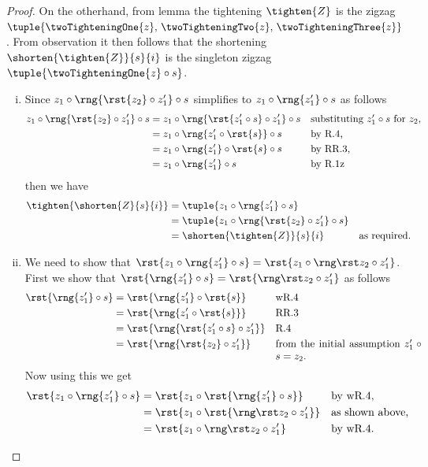 \begin{proof}
On the otherhand, from  lemma 
the tightening $\tighten{Z}$ is the zigzag
$\tuple{ \twoTighteningOne{z},\,\twoTighteningTwo{z},\,\twoTighteningThree{z}}$.
From observation 
it then follows that the shortening $\shorten{\tighten{Z}}{s}{i}$
is the singleton zigzag $\tuple{\twoTighteningOne{z} \circ s}$.
\begin{enumerate}[(i)]
\item %
Since $z_1 \circ \rng{\rst{z_2} \circ z'_1} \circ s$ 
simplifies to $z_1 \circ \rng{z'_1} \circ s$ as follows
\begin{align*}
 z_1 \circ \rng{\rst{z_2} \circ z'_1} \circ s
           &= z_1 \circ \rng{\rst{z'_1 \circ s} \circ z'_1} \circ s
           && \mbox{substituting $z'_1 \circ s$ for $z_2$,} \\
           &= z_1 \circ \rng{z'_1 \circ \rst{s}} \circ s 
           && \mbox{by R.4,} \\
           &= z_1 \circ \rng{z'_1} \circ \rst{s} \circ s
           && \mbox{by RR.3,} \\
           &= z_1 \circ \rng{z'_1} \circ s
           && \mbox{by R.1z} 
\end{align*}
then we have
\begin{align*}
\tighten{\shorten{Z}{s}{i}}
            &= \tuple{ z_1 \circ \rng{z'_1} \circ s } \\
            &= \tuple{
                       z_1 \circ \rng{\rst{z_2} \circ z'_1} \circ s
                     } \\
            &= \shorten{\tighten{Z}}{s}{i} &&\mbox{as required.}
\end{align*}  
\item %
We need to show that 
$\rst{z_1 \circ \rng{z'_1} \circ s}= \rst{z_1 \circ \rngTightenerOne{z}}$.
First we show that 
$\rst{\rng{z'_1} \circ s}=\rst{\rngTightenerOne{z}}$
as follows
\begin{align*}
\rst{\rng{z'_1} \circ s} 
    &= \rst{\rng{z'_1} \circ \rst{s}} && \mbox{wR.4}\\
    &= \rst{ \rng{ z'_1 \circ \rst{s} } }
                                      && \mbox{RR.3} \\
    &= \rst{ \rng{ \rst{z'_1 \circ s} \circ z'_1 } }
                                      && \mbox{R.4} \\
        &= \rst{ \rng{ \rst{z_2} \circ z'_1 } }
                        && \parbox[t]{5cm}{from the initial assumption 
                        $z'_1 \circ s = z_2$.} 
\end{align*}
Now using this we get
\begin{align*}
\rst{z_1 \circ \rng{z'_1} \circ s} 
                &=\rst{z_1 \circ \rst{\rng{z'_1} \circ s}} 
                &&\mbox{by wR.4,}\\
                &=\rst{z_1 \circ \rst{\rngTightenerOne{z}}}
                && \mbox{as shown above,}\\
                &= \rst{z_1 \circ \rngTightenerOne{z}}
                &&\mbox{by wR.4.}
\end{align*}


\end{enumerate}
\end{proof}

